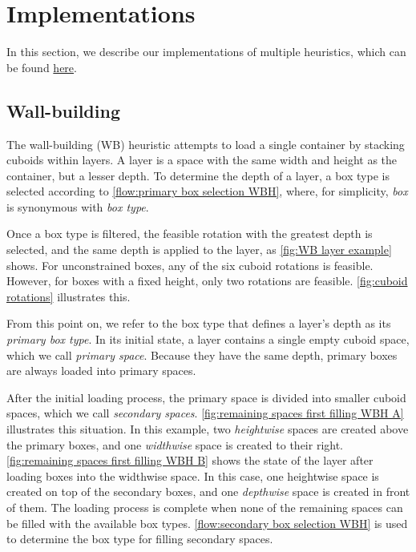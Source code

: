 \section{Implementations}

In this section, we describe our implementations of multiple heuristics, which can be found \href{https://github.com/phcentenaro7/IC-CLP/tree/main/Code/Authoral/Hummingbird}{here}.

\subsection{Wall-building}
\label{sec:wb implementation}

The wall-building (WB) heuristic attempts to load a single container by stacking cuboids within layers. A layer is a space with the same width and height as the container, but a lesser depth. To determine the depth of a layer, a box type is selected according to \cref{flow:primary box selection WBH}, where, for simplicity, \emph{box} is synonymous with \emph{box type}.



Once a box type is filtered, the feasible rotation with the greatest depth is selected, and the same depth is applied to the layer, as \cref{fig:WB layer example} shows. For unconstrained boxes, any of the six cuboid rotations is feasible. However, for boxes with a fixed height, only two rotations are feasible. \cref{fig:cuboid rotations} illustrates this.



From this point on, we refer to the box type that defines a layer's depth as its \emph{primary box type}. In its initial state, a layer contains a single empty cuboid space, which we call \emph{primary space}. Because they have the same depth, primary boxes are always loaded into primary spaces.



After the initial loading process, the primary space is divided into smaller cuboid spaces, which we call \emph{secondary spaces}. \cref{fig:remaining spaces first filling WBH A} illustrates this situation. In this example, two \emph{heightwise} spaces are created above the primary boxes, and one \emph{widthwise} space is created to their right. \cref{fig:remaining spaces first filling WBH B} shows the state of the layer after loading boxes into the widthwise space. In this case, one heightwise space is created on top of the secondary boxes, and one \emph{depthwise} space is created in front of them. The loading process is complete when none of the remaining spaces can be filled with the available box types. \cref{flow:secondary box selection WBH} is used to determine the box type for filling secondary spaces.

